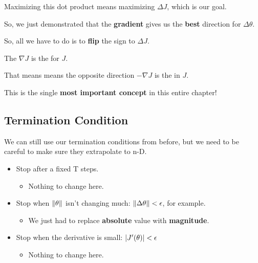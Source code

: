         Maximizing this dot product means maximizing $\Delta J$, which is our goal.
        
        So, we just demonstrated that the \textbf{gradient} gives us the \textbf{best} direction for $\Delta \theta$.
        
        So, all we have to do is to \textbf{flip} the sign to  $\Delta J$.
            \\
        
        \begin{concept}
            The  $\nabla J$ is the  for $J$.
            
            That means means the opposite direction $-\nabla J$ is the  in $J$.
        \end{concept}
        
        This is the single \textbf{most important concept} in this entire chapter!
        
        
    \subsection{Termination Condition}
    
        We can still use our termination conditions from before, but we need to be careful to make sure they extrapolate to n-D.
        
        \begin{itemize}
            \item Stop after a fixed T steps.
                \begin{itemize}
                    \item Nothing to change here. 
                \end{itemize}
                
            \item Stop when $\left\lVert\theta\right\rVert$ isn't changing much: $\left\lVert\Delta \theta\right\rVert < \epsilon$, for example.
                \begin{itemize}
                    \item We just had to replace \textbf{absolute} value with \textbf{magnitude}.
                \end{itemize}
                
            \item Stop when the derivative is small: $\abs{J'(\theta)} < \epsilon$
            
                \begin{itemize}
                    \item Nothing to change here.
                \end{itemize}
        \end{itemize}

